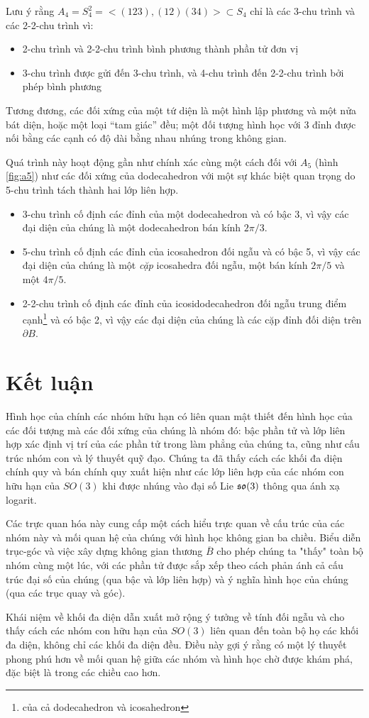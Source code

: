 \documentclass{article}
\theoremstyle{plain}
\theoremstyle{definition}
\begin{document}
Lưu ý rằng $A_4 = S_4^2=<(123), (12)(34)>\subset S_4$ chỉ là các 3-chu trình và các 2-2-chu trình vì: 
\begin{itemize}
    \item 2-chu trình và 2-2-chu trình bình phương thành phần tử đơn vị
    \item 3-chu trình được gửi đến 3-chu trình, và 4-chu trình đến 2-2-chu trình bởi phép bình phương
\end{itemize}
Tương đương, các đối xứng của một tứ diện là một hình lập phương và một nửa bát diện, hoặc một loại ``tam giác'' đều; một đối tượng hình học với 3 đỉnh được nối bằng các cạnh có độ dài bằng nhau nhúng trong không gian.

Quá trình này hoạt động gần như chính xác cùng một cách đối với $A_5$ (hình \ref{fig:a5}) như các đối xứng của dodecahedron với một sự khác biệt quan trọng do 5-chu trình tách thành hai lớp liên hợp. 
\begin{itemize}
    \item 3-chu trình cố định các đỉnh của một dodecahedron và có bậc 3, vì vậy các đại diện của chúng là một dodecahedron bán kính $2\pi/3$.
    \item 5-chu trình cố định các đỉnh của icosahedron đối ngẫu và có bậc 5, vì vậy các đại diện của chúng là một \emph{cặp} icosahedra đối ngẫu, một bán kính $2\pi/5$ và một $4\pi/5$.
    \item 2-2-chu trình cố định các đỉnh của icosidodecahedron đối ngẫu trung điểm cạnh\footnote{của cả dodecahedron và icosahedron} và có bậc 2, vì vậy các đại diện của chúng là các cặp đỉnh đối diện trên $\partial B$.
\end{itemize}

\section{Kết luận}
Hình học của chính các nhóm hữu hạn có liên quan mật thiết đến hình học của các đối tượng mà các đối xứng của chúng là nhóm đó:  bậc phần tử và lớp liên hợp xác định vị trí của các phần tử trong làm phẳng của chúng ta, cũng như cấu trúc nhóm con và lý thuyết quỹ đạo. Chúng ta đã thấy cách các khối đa diện chính quy và bán chính quy xuất hiện như các lớp liên hợp của các nhóm con hữu hạn của $SO(3)$ khi được nhúng vào đại số Lie $\mathfrak{so}(3)$ thông qua ánh xạ logarit. 

Các trực quan hóa này cung cấp một cách hiểu trực quan về cấu trúc của các nhóm này và mối quan hệ của chúng với hình học không gian ba chiều. Biểu diễn trục-góc và việc xây dựng không gian thương $\overline{B}$ cho phép chúng ta "thấy" toàn bộ nhóm cùng một lúc, với các phần tử được sắp xếp theo cách phản ánh cả cấu trúc đại số của chúng (qua bậc và lớp liên hợp) và ý nghĩa hình học của chúng (qua các trục quay và góc).

Khái niệm về khối đa diện dẫn xuất mở rộng ý tưởng về tính đối ngẫu và cho thấy cách các nhóm con hữu hạn của $SO(3)$ liên quan đến toàn bộ họ các khối đa diện, không chỉ các khối đa diện đều. Điều này gợi ý rằng có một lý thuyết phong phú hơn về mối quan hệ giữa các nhóm và hình học chờ được khám phá, đặc biệt là trong các chiều cao hơn. 



\end{document}

